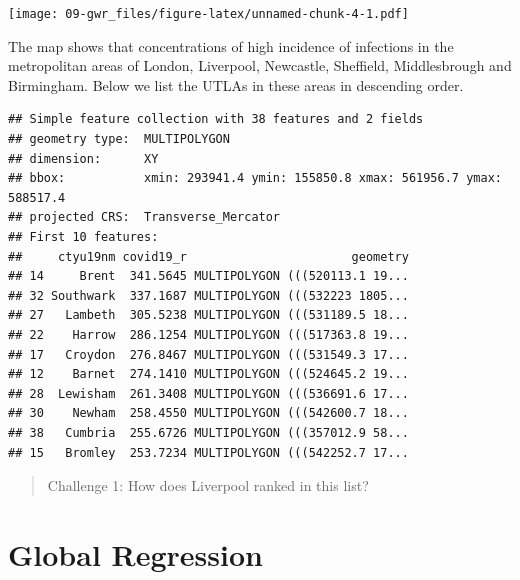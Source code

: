 \documentclass[
]{book}
\newenvironment{Shaded}{\begin{snugshade}}{\end{snugshade}}
\newcommand{\DecValTok}[1]{\textcolor[rgb]{0.00,0.00,0.81}{#1}}
\newcommand{\FunctionTok}[1]{\textcolor[rgb]{0.00,0.00,0.00}{#1}}
\newcommand{\NormalTok}[1]{#1}
\newcommand{\OtherTok}[1]{\textcolor[rgb]{0.56,0.35,0.01}{#1}}
\newcommand{\SpecialCharTok}[1]{\textcolor[rgb]{0.00,0.00,0.00}{#1}}
\begin{document}
\texttt{[image: 09-gwr\_files/figure-latex/unnamed-chunk-4-1.pdf]}

The map shows that concentrations of high incidence of infections in the metropolitan areas of London, Liverpool, Newcastle, Sheffield, Middlesbrough and Birmingham. Below we list the UTLAs in these areas in descending order.

\begin{Shaded}
\end{Shaded}

\begin{verbatim}
## Simple feature collection with 38 features and 2 fields
## geometry type:  MULTIPOLYGON
## dimension:      XY
## bbox:           xmin: 293941.4 ymin: 155850.8 xmax: 561956.7 ymax: 588517.4
## projected CRS:  Transverse_Mercator
## First 10 features:
##     ctyu19nm covid19_r                       geometry
## 14     Brent  341.5645 MULTIPOLYGON (((520113.1 19...
## 32 Southwark  337.1687 MULTIPOLYGON (((532223 1805...
## 27   Lambeth  305.5238 MULTIPOLYGON (((531189.5 18...
## 22    Harrow  286.1254 MULTIPOLYGON (((517363.8 19...
## 17   Croydon  276.8467 MULTIPOLYGON (((531549.3 17...
## 12    Barnet  274.1410 MULTIPOLYGON (((524645.2 19...
## 28  Lewisham  261.3408 MULTIPOLYGON (((536691.6 17...
## 30    Newham  258.4550 MULTIPOLYGON (((542600.7 18...
## 38   Cumbria  255.6726 MULTIPOLYGON (((357012.9 58...
## 15   Bromley  253.7234 MULTIPOLYGON (((542252.7 17...
\end{verbatim}

\begin{quote}
Challenge 1:
How does Liverpool ranked in this list?
\end{quote}

\hypertarget{global-regression}{%
\section{Global Regression}\label{global-regression}}
\end{document}

